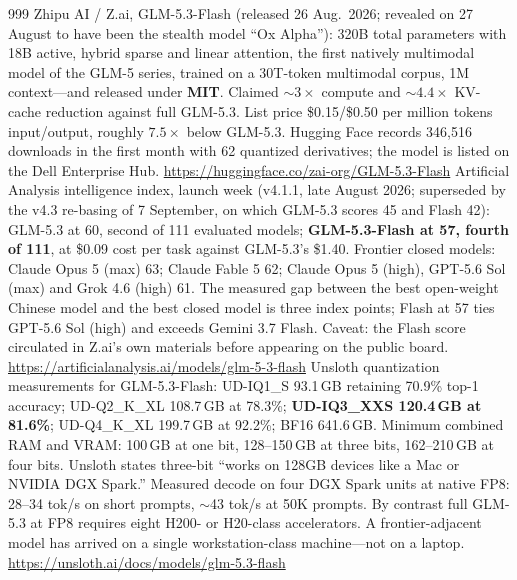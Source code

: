 \begin{thebibliography}{999}
 Zhipu AI / Z.ai, GLM-5.3-Flash (released 26 Aug.\ 2026; revealed on 27 August to have been the stealth model ``Ox Alpha''): 320B total parameters with 18B active, hybrid sparse and linear attention, the first natively multimodal model of the GLM-5 series, trained on a 30T-token multimodal corpus, 1M context---and released under \textbf{MIT}. Claimed $\sim3\times$ compute and $\sim4.4\times$ KV-cache reduction against full GLM-5.3. List price \$0.15/\$0.50 per million tokens input/output, roughly $7.5\times$ below GLM-5.3. Hugging Face records 346{,}516 downloads in the first month with 62 quantized derivatives; the model is listed on the Dell Enterprise Hub. \url{https://huggingface.co/zai-org/GLM-5.3-Flash}
 Artificial Analysis intelligence index, launch week (v4.1.1, late August 2026; superseded by the v4.3 re-basing of 7 September, on which GLM-5.3 scores 45 and Flash 42): GLM-5.3 at 60, second of 111 evaluated models; \textbf{GLM-5.3-Flash at 57, fourth of 111}, at \$0.09 cost per task against GLM-5.3's \$1.40. Frontier closed models: Claude Opus 5 (max) 63; Claude Fable 5 62; Claude Opus 5 (high), GPT-5.6 Sol (max) and Grok 4.6 (high) 61. The measured gap between the best open-weight Chinese model and the best closed model is three index points; Flash at 57 ties GPT-5.6 Sol (high) and exceeds Gemini 3.7 Flash. Caveat: the Flash score circulated in Z.ai's own materials before appearing on the public board. \url{https://artificialanalysis.ai/models/glm-5-3-flash}
 Unsloth quantization measurements for GLM-5.3-Flash: UD-IQ1\_S 93.1\,GB retaining 70.9\% top-1 accuracy; UD-Q2\_K\_XL 108.7\,GB at 78.3\%; \textbf{UD-IQ3\_XXS 120.4\,GB at 81.6\%}; UD-Q4\_K\_XL 199.7\,GB at 92.2\%; BF16 641.6\,GB. Minimum combined RAM and VRAM: 100\,GB at one bit, 128--150\,GB at three bits, 162--210\,GB at four bits. Unsloth states three-bit ``works on 128GB devices like a Mac or NVIDIA DGX Spark.'' Measured decode on four DGX Spark units at native FP8: 28--34 tok/s on short prompts, $\sim$43 tok/s at 50K prompts. By contrast full GLM-5.3 at FP8 requires eight H200- or H20-class accelerators. A frontier-adjacent model has arrived on a single workstation-class machine---not on a laptop. \url{https://unsloth.ai/docs/models/glm-5.3-flash}

\end{thebibliography}

